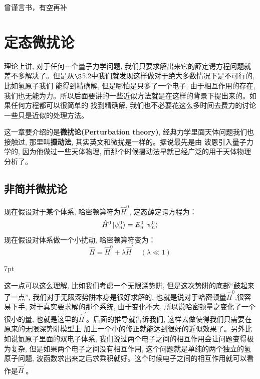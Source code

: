 \documentclass[a4paper,zihao=-4,linespread=1]{ctexrep}
\newenvironment{thinknote}{%
\def\FrameCommand{%
\hspace{1pt}%
{\color{BurlyWood}\vrule width 2pt}%
{\color{formalshade}\vrule width 4pt}%
\colorbox{formalshade}%
}%
\MakeFramed{\advance\hsize-\width\FrameRestore}%
\noindent\hspace{-4.55pt}%
\begin{adjustwidth}{}{7pt}%
\vspace{2pt}\vspace{2pt}%
}
{%
\vspace{2pt}\end{adjustwidth}\endMakeFramed%
}
\begin{document}
	曾谨言书，有空再补
	
	
	
    \chapter{定态微扰论}
    理论上讲, 对于任何一个量子力学问题, 我们只要求解出来它的薛定谔方程问题就差不多解决了。但是从$\S$5.2中我们就发现这样做对于绝大多数情况下是不可行的, 比如氢原子我们
    能得到精确解, 但是哪怕是只多了一个电子, 由于相互作用的存在, 我们也无能为力。所以后面要讲的一些近似方法就是在这样的背景下提出来的。如果任何方程都可以很简单的
    找到精确解, 我们也不必要花这么多时间去费力的讨论一些只是近似的处理方法。
    
    这一章要介绍的是\textbf{微扰论(Perturbation theory)}, 经典力学里面天体问题我们也接触过, 那里叫\textbf{摄动法}, 其实英文和微扰是一样的。据说最先是由
    波恩引入量子力学的, 因为他做过一些天体物理, 而那个时候摄动法早就已经广泛的用于天体物理分析了。

    \section{非简并微扰论}
    现在假设对于某个体系, 哈密顿算符为$\hat{H}^0$, 定态薛定谔方程为：
    \begin{equation}
        \label{eq:7.1}
        \hat{H}^0\ket{\psi_n^0}=E_n^0\ket{\psi_n^0}
    \end{equation}
    现在假设对体系做一个小扰动, 哈密顿算符变为：
    \[\hat{H}=\hat{H}^0+\lambda\hat{H}^\prime\quad(\lambda\ll 1)\]
    \begin{thinknote}
    \setlength\parindent{2em}这一点可以这么理解, 比如我们考虑一个无限深势阱, 但是这次势阱的底部“鼓起来了一点”, 我们对于无限深势阱本身是很好求解的, 也就是说对于哈密顿量$\hat{H}^0$,很容易下手,
    对于真实要求解的那个系统, 由于变化不大, 所以说哈密顿量之变化了一个很小的量, 也就是这里的$\hat{H}^\prime$。后面的推导就告诉我们, 这样去做使得我们只需要在原来的无限深势阱模型上
    加上一个小的修正就能达到很好的近似效果了。另外比如说氦原子里面的双电子体系, 我们说过两个电子之间的相互作用会让问题变得极为复杂, 但是如果两个电子之间没有相互作用,
    这个问题就是单纯的两个独立的氢原子问题, 波函数求出来之后求乘积就好。这个时候电子之间的相互作用就可以看作是$\hat{H}^\prime$。
    \end{thinknote}
\end{document}

